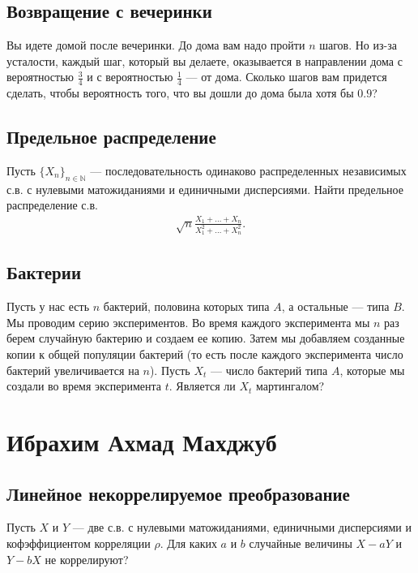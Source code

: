 \documentclass[12pt]{article}
\newcommand\N{\mathbb{N}}
\begin{document}
\subsection{Возвращение с вечеринки}

Вы идете домой после вечеринки. До дома вам надо пройти $n$ шагов. Но из-за усталости, каждый шаг, который вы делаете, оказывается в направлении дома с вероятностью $\frac{3}{4}$ и с вероятностью $\frac{1}{4}$ --- от дома. Сколько шагов вам придется сделать, чтобы вероятность того, что вы дошли до дома была хотя бы $0.9$?

\subsection{Предельное распределение}

Пусть $\{X_n\}_{n \in \N}$ --- последовательность одинаково распределенных независимых с.в. с нулевыми матожиданиями и единичными дисперсиями. Найти предельное распределение с.в.
\begin{align*}
    \sqrt{n}\frac{X_1 + \dots + X_n}{X_1^2 + \dots + X_n^2}.
\end{align*}

\subsection{Бактерии}

Пусть у нас есть $n$ бактерий, половина которых типа $A$, а остальные --- типа $B$. Мы проводим серию экспериментов. Во время каждого эксперимента мы $n$ раз берем случайную бактерию и создаем ее копию. Затем мы добавляем созданные копии к общей популяции бактерий (то есть после каждого эксперимента число бактерий увеличивается на $n$). Пусть $X_t$ --- число бактерий типа $A$, которые мы создали во время эксперимента $t$. Является ли $X_t$ мартингалом?


\newpage
\section{Ибрахим Ахмад Махджуб}

\subsection{Линейное некоррелируемое преобразование}

Пусть $X$ и $Y$ --- две с.в. с нулевыми матожиданиями, единичными дисперсиями и кофэффициентом корреляции $\rho$. Для каких $a$ и $b$ случайные величины $X - aY$ и $Y - bX$ не коррелируют?
\end{document}

